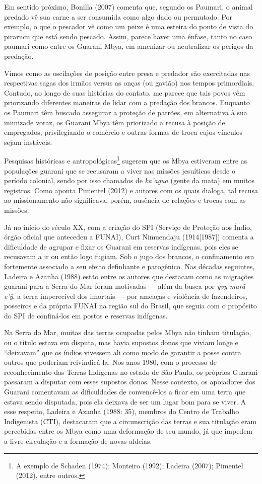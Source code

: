 Em sentido próximo, Bonilla (2007) comenta que, segundo os Paumari, o
animal predado vê sua carne a ser consumida como algo dado ou permutado.
Por exemplo, o que o pescador vê como um peixe é uma esteira do ponto de
vista do pirarucu que está sendo pescado. Assim, parece haver uma
ênfase, tanto no caso paumari como entre os Guarani Mbya, em amenizar ou
neutralizar os perigos da predação.

Vimos como as oscilações de posição entre presa e predador são
exercitadas nas respectivas sagas dos irmãos versus as onças (ou gavião)
nos tempos primordiais. Contudo, ao longo de suas histórias do contato,
me parece que tais povos vêm priorizando diferentes maneiras de lidar
com a predação dos brancos. Enquanto os Paumari têm buscado assegurar a
proteção de patrões, em alternativa à sua inimizade voraz, os Guarani
Mbya têm priorizado a recusa à posição de empregados, privilegiando o
comércio e outras formas de troca cujos vínculos sejam instáveis.

Pesquisas históricas e antropológicas\footnote{A exemplo de Schaden
  (1974); Monteiro (1992); Ladeira (2007); Pimentel (2012), entre
  outros.} sugerem que os Mbya estiveram entre as populações guarani que
se recusaram a viver nas missões jesuíticas desde o período colonial,
sendo por isso chamados de \emph{ka'agua} (gente da mata) em muitos
registros. Como aponta Pimentel (2012) e autores com os quais dialoga,
tal recusa ao missionamento não significava, porém, ausência de relações
e trocas com as missões.

Já no início do século XX, com a criação do SPI (Serviço de Proteção aos
Índio, órgão oficial que antecedeu a FUNAI), Curt Nimuendaju
(1914{[}1987{]}) comenta a dificuldade de agrupar e fixar os Guarani em
reservas indígenas, pois eles se recusavam a ir ou então logo fugiam.
Sob o jugo dos brancos, o confinamento era fortemente associado a seu
efeito definhante e patogênico. Nas décadas seguintes, Ladeira e Azanha
(1988) estão entre os autores que destacam como as migrações guarani
para a Serra do Mar foram motivadas --- além da busca por \emph{yvy marã
e'ỹ}, a terra imperecível dos imortais --- por ameaças e violência de
fazendeiros, posseiros e da própria FUNAI na região sul do Brasil, que
seguia com o propósito do SPI de confiná-los em postos e reservas
indígenas.

Na Serra do Mar, muitas das terras ocupadas pelos Mbya não tinham
titulação, ou o título estava em disputa, mas havia supostos donos que
viviam longe e ``deixavam'' que os índios vivessem ali como modo de
garantir a posse contra outros que poderiam reivindicá-la. Nos anos
1980, com o processo de reconhecimento das Terras Indígenas no estado de
São Paulo, os próprios Guarani passaram a disputar com esses supostos
donos. Nesse contexto, os apoiadores dos Guarani comentavam as
dificuldades de convencê-los a ficar em uma terra que estava sendo
disputada, pois ela deixava de ser um lugar bom para se viver. A esse
respeito, Ladeira e Azanha (1988: 35), membros do Centro de Trabalho
Indigenista (CTI), destacaram que a circunscrição das terras e sua
titulação eram percebidas entre os Mbya como uma deformação de seu
mundo, já que impedem a livre circulação e a formação de novas aldeias.

